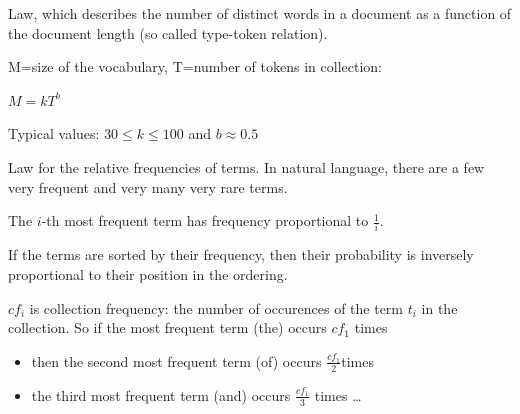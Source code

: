 \begin{breakbox}

Law, which describes the number of distinct words in a document as a function of the document length (so called type-token relation).

M=size of the vocabulary, T=number of tokens in collection:
\begin{center}
	$M=kT^b$
\end{center}

Typical values: $30 \leq k \leq 100$ and $b \approx 0.5$
\end{breakbox}

\begin{breakbox}

Law for the relative frequencies of terms. In natural language, there are a few very frequent and very many very rare terms.

\begin{center}
	The $i$-th most frequent term has frequency proportional to $\frac{1}{i}$.
\end{center}

If the terms are sorted by their frequency, then their probability is inversely proportional to their position in the ordering.

$cf_i$ is collection frequency: the number of occurences of the term $t_i$ in the collection. So if the most frequent term (the) occurs $cf_1$ times
\begin{itemize}
	\item then the second most frequent term (of) occurs
$\frac{cf_1}{2}$times
	\item the third most frequent term (and) occurs $\frac{cf_1}{3}$ times \ldots
\end{itemize}
\end{breakbox}

